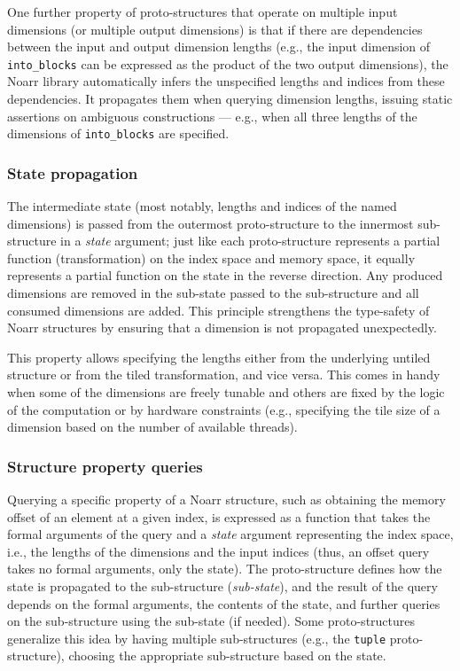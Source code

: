 One further property of proto-structures that operate on multiple input dimensions (or multiple output dimensions) is that if there are dependencies between the input and output dimension lengths (e.g., the input dimension of \lstinline{into_blocks} can be expressed as the product of the two output dimensions), the Noarr library automatically infers the unspecified lengths and indices from these dependencies. It propagates them when querying dimension lengths, issuing static assertions on ambiguous constructions --- e.g., when all three lengths of the dimensions of \lstinline{into_blocks} are specified.


\subsubsection*{State propagation}

The intermediate state (most notably, lengths and indices of the named dimensions) is passed from the outermost proto-structure to the innermost sub-structure in a \emph{state} argument; just like each proto-structure represents a partial function (transformation) on the index space and memory space, it equally represents a partial function on the state in the reverse direction. Any produced dimensions are removed in the sub-state passed to the sub-structure and all consumed dimensions are added. This principle strengthens the type-safety of Noarr structures by ensuring that a dimension is not propagated unexpectedly.

This property allows specifying the lengths either from the underlying untiled structure or from the tiled transformation, and vice versa. This comes in handy when some of the dimensions are freely tunable and others are fixed by the logic of the computation or by hardware constraints (e.g., specifying the tile size of a dimension based on the number of available threads).


\subsubsection*{Structure property queries}

Querying a specific property of a Noarr structure, such as obtaining the memory offset of an element at a given index, is expressed as a function that takes the formal arguments of the query and a \emph{state} argument representing the index space, i.e., the lengths of the dimensions and the input indices (thus, an offset query takes no formal arguments, only the state). The proto-structure defines how the state is propagated to the sub-structure (\emph{sub-state}), and the result of the query depends on the formal arguments, the contents of the state, and further queries on the sub-structure using the sub-state (if needed). Some proto-structures generalize this idea by having multiple sub-structures (e.g., the \lstinline{tuple} proto-structure), choosing the appropriate sub-structure based on the state.


